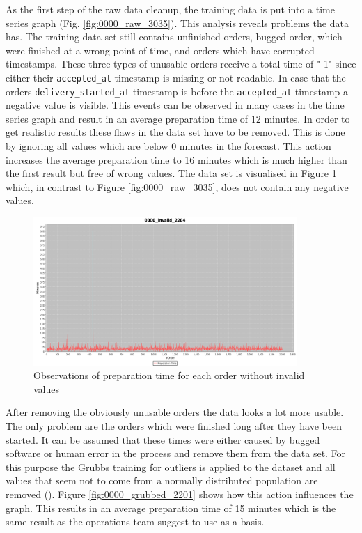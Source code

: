 As the first step of the raw data cleanup, the training data is put into a time series graph (Fig. \ref{fig:0000_raw_3035}). This analysis reveals problems the data has. The training data set still contains unfinished orders, bugged order, which were finished at a wrong point of time, and orders which have corrupted timestamps. These three types of unusable orders receive a total time of "-1" since either their \texttt{accepted\_at} timestamp is missing or not readable. In case that the orders \texttt{delivery\_started\_at} timestamp is before the \texttt{accepted\_at} timestamp a negative value is visible. This events can be observed in many cases in the time series graph and result in an average preparation time of 12 minutes. In order to get realistic results these flaws in the data set have to be removed. This is done by ignoring all values which are below 0 minutes in the forecast. This action increases the average preparation time to 16 minutes which is much higher than the first result but free of wrong values. The data set is visualised in Figure \ref{fig:0000_invalid_2204} which, in contrast to Figure \ref{fig:0000_raw_3035}, does not contain any negative values.

\begin{figure}[h]
\begin{center}
\includegraphics[width=10cm]{images/0000_invalid_2204.png}
\caption{Observations of preparation time for each order without invalid values}
\label{fig:0000_invalid_2204}
\end{center}
\end{figure}

After removing the obviously unusable orders the data looks a lot more usable. The only problem are the orders which were finished long after they have been started. It can be assumed that these times were either caused by bugged software or human error in the process and remove them from the data set. For this purpose the Grubbs training for outliers is applied to the dataset and all values that seem not to come from a normally distributed population are removed (\cite{Grubbs}). Figure \ref{fig:0000_grubbed_2201} shows how this action influences the graph. This results in an average preparation time of 15 minutes which is the same result as the operations team suggest to use as a basis.

